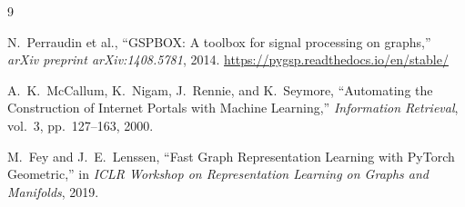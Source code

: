 \documentclass{article}
\begin{document}
\newpage
\begin{thebibliography}{9}

N.~Perraudin et al.,
``GSPBOX: A toolbox for signal processing on graphs,''
\textit{arXiv preprint arXiv:1408.5781}, 2014.
\url{https://pygsp.readthedocs.io/en/stable/}

A.~K.~McCallum, K.~Nigam, J.~Rennie, and K.~Seymore,
``Automating the Construction of Internet Portals with Machine Learning,''
\textit{Information Retrieval}, vol.~3, pp.~127--163, 2000.

M.~Fey and J.~E.~Lenssen,
``Fast Graph Representation Learning with PyTorch Geometric,''
in \textit{ICLR Workshop on Representation Learning on Graphs and Manifolds}, 2019.

\end{thebibliography}
\end{document}
